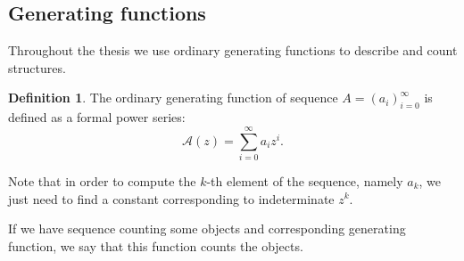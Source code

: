 \documentclass[final]{article}
\theoremstyle{definition}
\newtheorem{definition}{Definition}[subsection]
\theoremstyle{definition}
\theoremstyle{remark}
\newcommand{\gf}[1]{\ensuremath{\mathcal{#1}}}
\begin{document}
\subsection{Generating functions}%
\label{sub:generating_functions}

Throughout the thesis we use ordinary generating functions to describe and count structures.

\begin{definition}
The ordinary generating function of sequence \(A = (a_i)_{i=0}^{\infty}\) is defined as a formal power series:
\[\gf{A}(z) = \sum_{i=0}^{\infty} a_i z^i .\]
\end{definition}

Note that in order to compute the \(k\)-th element of the sequence, namely \(a_k\), we just need to find a constant corresponding to indeterminate \(z^k\).

If we have sequence counting some objects and corresponding generating function, we say that this function counts the objects.
\end{document}
